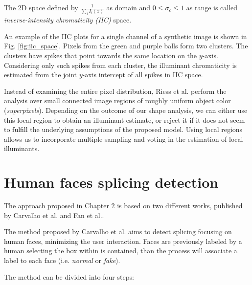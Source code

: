 The 2D space defined by $\frac{1}{\sum_{i} I_i(x)}$ as domain and $0 \leq \sigma_c \leq 1$ as range is called \emph{inverse-intensity chromaticity (IIC)} space.

An example of the IIC plots for a single channel of a synthetic image is shown in Fig. \ref{fig:iic_space}.
Pixels from the green and purple balls form two clusters. The clusters have spikes that point towards the same location on the $y$-axis. Considering only such spikes from each cluster, the illuminant chromaticity is estimated from the joint $y$-axis intercept of all spikes in IIC space.

Instead of examining the entire pixel distribution, Riess et al.\cite{riess2010scene} perform the analysis over small connected image regions of roughly uniform object color (\emph{superpixels}). Depending on the outcome of our shape analysis, we can either use this local region to obtain an illuminant estimate, or reject it if it does not seem to fulfill the underlying assumptions of the proposed model. Using local regions allows us to incorporate multiple sampling and voting in the estimation of local illuminants.

\section{Human faces splicing detection}

The approach proposed in Chapter 2 is based on two different works, published by Carvalho et al.\cite{carvalho2016illuminant} and Fan et al.\cite{fan2015image}.

The method proposed by Carvalho et al.\cite{carvalho2016illuminant} aims to detect splicing focusing on human faces, minimizing the user interaction. Faces are previously labeled by a human selecting the box within is contained, than the process will associate a label to each face (i.e. \emph{normal} or \emph{fake}).

The method can be divided into four steps:

